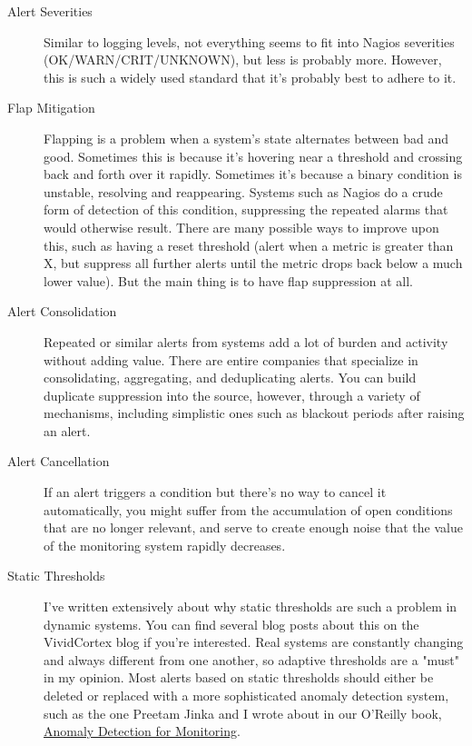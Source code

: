 \documentclass{vivid_layout}
\begin{document}
\begin{description}

\item[Alert Severities] Similar to logging levels, not everything seems to fit
into Nagios severities (OK/WARN/CRIT/UNKNOWN), but less is probably more.
However, this is such a widely used standard that it's probably best to adhere
to it.

\item[Flap Mitigation] Flapping is a problem when a system's state alternates
between bad and good. Sometimes this is because it's hovering near a threshold
and crossing back and forth over it rapidly. Sometimes it's because a binary
condition is unstable, resolving and reappearing. Systems such as Nagios do a
crude form of detection of this condition, suppressing the repeated alarms that
would otherwise result. There are many possible ways to improve upon this, such
as having a reset threshold (alert when a metric is greater than X, but suppress
all further alerts until the metric drops back below a much lower value). But
the main thing is to have flap suppression at all.

\item[Alert Consolidation] Repeated or similar alerts from systems add a lot of burden
and activity without adding value. There are entire companies that specialize in
consolidating, aggregating, and deduplicating alerts. You can build duplicate
suppression into the source, however, through a variety
of mechanisms, including simplistic ones such as blackout periods after raising an
alert.

\item[Alert Cancellation] If an alert triggers a condition but there's no way to
cancel it automatically, you might suffer from the accumulation of
open conditions that are no longer relevant, and serve to create enough noise
that the value of the monitoring system rapidly decreases.

\item[Static Thresholds] I've written extensively about why static thresholds
are such a problem in dynamic systems. You can find several blog posts about
this on the VividCortex blog if you're interested. Real systems are constantly
changing and always different from one another, so adaptive thresholds are a
"must" in my opinion. Most alerts based on static thresholds should either be
deleted or replaced with a more sophisticated anomaly detection system, such as
the one Preetam Jinka and I wrote about in our O'Reilly book,
\href{https://www.vividcortex.com/blog/anomaly-detection-for-monitoring-a-new-ebook-in-collaboration-with-oreilly-and-ruxit}{Anomaly
Detection for Monitoring}.


\end{description}
\end{document}
